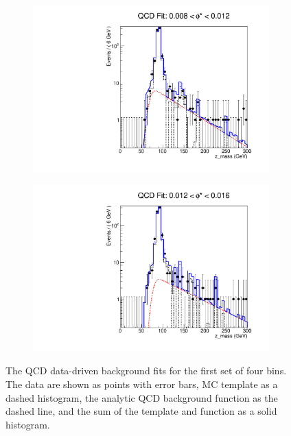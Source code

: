 \begin{figure}[!htbp]
\begin{subfigure}[b]{0.5\textwidth}
        \caption{}
        \label{fig:qcd_fit_02}
    \end{subfigure}
    \begin{subfigure}[b]{0.5\textwidth}
        \includegraphics[width=\linewidth]{figures/qcd_fits/qcd_fit_plot_for_03.pdf}
        \caption{}
        \label{fig:qcd_fit_03}
    \end{subfigure}%
    \begin{subfigure}[b]{0.5\textwidth}
        \includegraphics[width=\linewidth]{figures/qcd_fits/qcd_fit_plot_for_04.pdf}
        \caption{}
        \label{fig:qcd_fit_04}
    \end{subfigure}
    \caption{
       The QCD data-driven background fits for the first set of four \phistar
       bins. The data are shown as points with error bars, MC template as a
       dashed histogram, the analytic QCD background function as the dashed
       line, and the sum of the template and function as a solid histogram.
    }
    \label{fig:qcd_many_1}
\end{figure}

